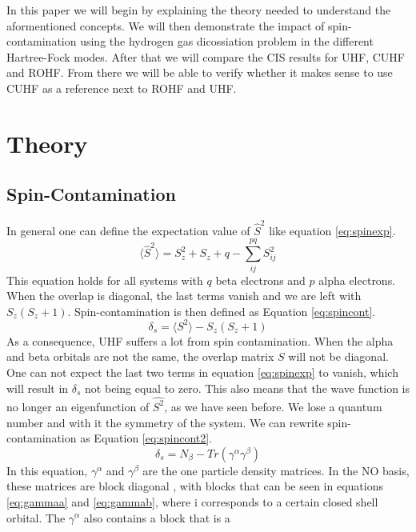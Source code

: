 \documentclass[twoside,twocolumn,9pt]{article}
\begin{document}
In this paper we will begin by explaining the theory needed to understand the aformentioned concepts. We will then demonstrate the impact of spin-contamination using the hydrogen gas
dicossiation problem in the different Hartree-Fock modes. After that we will compare the CIS results for UHF, CUHF and ROHF. From there we will be able to verify whether it makes
sense to use CUHF as a reference next to ROHF and UHF.


\section{Theory}

\subsection{Spin-Contamination}
In general one can define the expectation value of $\hat{S}^2$ like equation \eqref{eq:spinexp}\cite{Andrews1991}.
\begin{equation}\label{eq:spinexp}
  \langle \hat{S}^2 \rangle = S_z^2 + S_z + q - \sum_{ij}^{pq} S_{ij}^2
\end{equation}
This equation holds for all systems with $q$ beta electrons and $p$ alpha electrons. When the overlap is diagonal, the last terms vanish and we are left with $S_z(S_z + 1)$.
Spin-contamination is then defined as Equation \eqref{eq:spincont}.
\begin{equation}\label{eq:spincont}
  \delta_s = \langle S^2 \rangle - S_z(S_z + 1)
\end{equation}
As a consequence, UHF suffers a lot from spin contamination. When the alpha and beta orbitals are not the same, the overlap matrix $S$ will not be diagonal. One can not expect the
last two terms in equation \eqref{eq:spinexp} to vanish, which will result in $\delta_s$ not being equal to zero. This also means that the wave function is no longer an eigenfunction
of $\hat{S^2}$, as we have seen before. We lose a quantum number and with it the symmetry of the system. We can rewrite spin-contamination as Equation \eqref{eq:spincont2}\cite{Savin2010}.
\begin{equation}\label{eq:spincont2}
  \delta_s = N_\beta - Tr(\gamma^\alpha\gamma^\beta)
\end{equation}
In this equation, $\gamma^{\alpha}$ and $\gamma^\beta$ are the one particle density matrices. In the NO basis, these matrices are block diagonal \cite{Scuseria2010}, with blocks that
can be seen in equations \eqref{eq:gammaa} and \eqref{eq:gammab}, where i corresponds to a certain closed shell orbital. The $\gamma^\alpha$ also contains a block that is a
\end{document}
